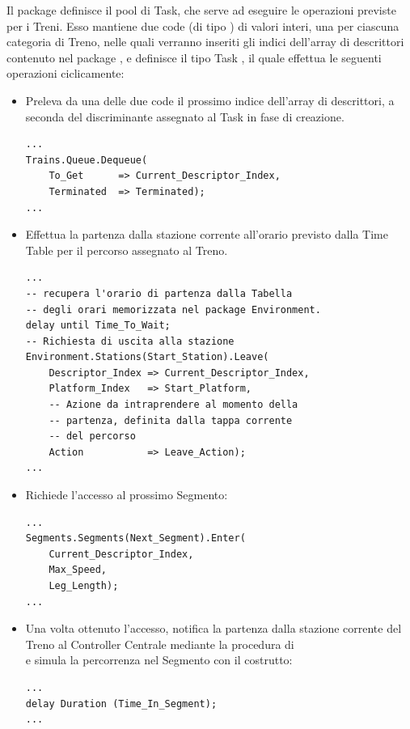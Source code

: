 	Il package  definisce il pool di Task, che serve ad eseguire le operazioni previste per i Treni. Esso mantiene due code (di tipo ) di valori interi, una per ciascuna categoria di Treno, nelle quali verranno inseriti gli indici dell'array di descrittori  contenuto nel package , e definisce il tipo Task , il quale effettua le seguenti operazioni ciclicamente:
	\begin{itemize}
		\item Preleva da una delle due code il prossimo indice dell'array di descrittori, a seconda del discriminante  assegnato al Task in fase di creazione. 

\begin{lstlisting}
...
Trains.Queue.Dequeue(
	To_Get      => Current_Descriptor_Index,
	Terminated  => Terminated);
...
\end{lstlisting}

		\item Effettua la partenza dalla stazione corrente all'orario previsto dalla Time Table per il percorso assegnato al Treno.
\begin{lstlisting}
...
-- recupera l'orario di partenza dalla Tabella
-- degli orari memorizzata nel package Environment.
delay until Time_To_Wait;
-- Richiesta di uscita alla stazione
Environment.Stations(Start_Station).Leave(
	Descriptor_Index => Current_Descriptor_Index,
	Platform_Index   => Start_Platform,
	-- Azione da intraprendere al momento della 
	-- partenza, definita dalla tappa corrente
	-- del percorso
	Action           => Leave_Action);
...
\end{lstlisting}
		 
		\item Richiede l'accesso al prossimo Segmento:

\begin{lstlisting}
...
Segments.Segments(Next_Segment).Enter(
	Current_Descriptor_Index,
	Max_Speed,
	Leg_Length);
...
\end{lstlisting}		
		\item Una volta ottenuto l'accesso, notifica la partenza dalla stazione corrente del Treno al Controller Centrale mediante la procedura  di \\ e simula la percorrenza nel Segmento con il costrutto:

\begin{lstlisting}
...
delay Duration (Time_In_Segment);
...
\end{lstlisting}
		

\end{itemize}
